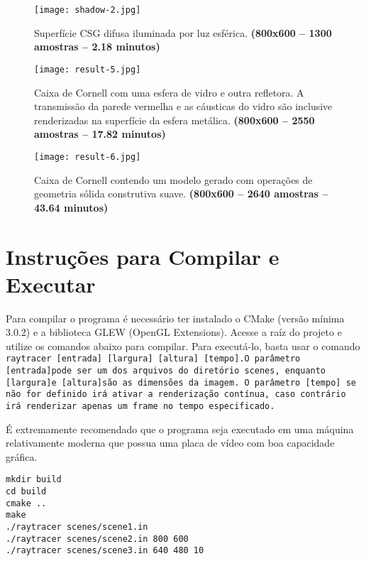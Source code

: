 \documentclass[11pt,a4paper]{article}
\begin{document}
\begin{figure}[htpb]
  \centering
  \texttt{[image: shadow-2.jpg]}
  \caption{Superfície CSG difusa iluminada por luz esférica. \textbf{(800x600 -- 1300 amostras -- 2.18 minutos)}}
\end{figure}

\begin{figure}[htpb]
  \centering
  \texttt{[image: result-5.jpg]}
  \caption{Caixa de Cornell com uma esfera de vidro e outra refletora. A transmissão da parede vermelha e as cáusticas do vidro são inclusive renderizadas na superfície da esfera metálica. \textbf{(800x600 -- 2550 amostras -- 17.82 minutos)}}
\end{figure}

\begin{figure}[htpb]
  \centering
  \texttt{[image: result-6.jpg]}
  \caption{Caixa de Cornell contendo um modelo gerado com operações de geometria sólida construtiva suave. \textbf{(800x600 -- 2640 amostras -- 43.64 minutos)}}
  \label{fig:csg-2}
\end{figure}

\newpage
\section{Instruções para Compilar e Executar}
\label{sec:instructions}

Para compilar o programa é necessário ter instalado o CMake (versão mínima 3.0.2) e a biblioteca GLEW (OpenGL Extensions). Acesse a raíz do projeto e utilize os comandos abaixo para compilar. Para executá-lo, basta usar o comando \tt{raytracer [entrada] [largura] [altura] [tempo]}.\rm O parâmetro \tt{[entrada]}\rm pode ser um dos arquivos do diretório \tt scenes\rm, enquanto \tt [largura]\rm e \tt [altura]\rm são as dimensões da imagem. O parâmetro \tt [tempo] \rm se não for definido irá ativar a renderização contínua, caso contrário irá renderizar apenas um frame no tempo especificado.

É extremamente recomendado que o programa seja executado em uma máquina relativamente moderna que possua uma placa de vídeo com boa capacidade gráfica.

\begin{verbatim}
mkdir build
cd build
cmake ..
make
./raytracer scenes/scene1.in
./raytracer scenes/scene2.in 800 600
./raytracer scenes/scene3.in 640 480 10
\end{verbatim}
\end{document}

